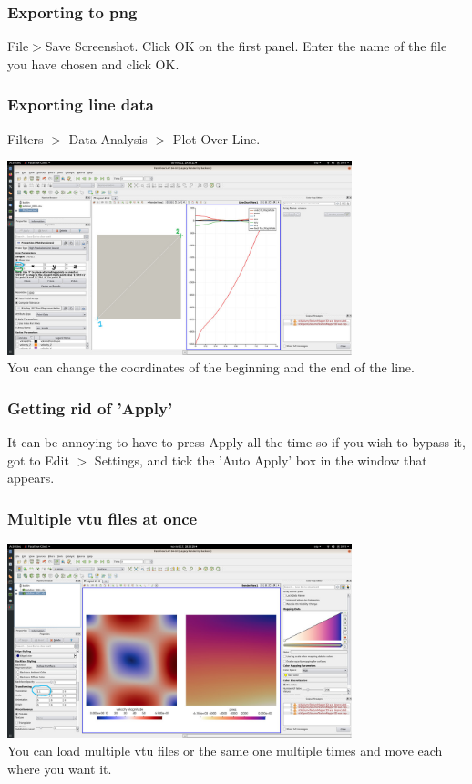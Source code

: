 \subsubsection*{Exporting to png}

File$>$Save Screenshot. Click OK on the first panel. Enter the name of the file you have chosen and click OK.   

\subsubsection*{Exporting line data}

Filters $>$ Data Analysis $>$ Plot Over Line.  

\begin{center}
\includegraphics[width=10cm]{images/paraview/p13}\\
{\captionfont You can change the coordinates of the beginning and the end of the line.} 
\end{center}

\subsubsection*{Getting rid of 'Apply'}

It can be annoying to have to press Apply all the time so if you wish to bypass it, got to Edit $>$ Settings, and 
tick the 'Auto Apply' box in the window that appears.

\subsubsection*{Multiple vtu files at once}

\begin{center}
\includegraphics[width=10cm]{images/paraview/p14}\\
{\captionfont You can load multiple vtu files or the same one multiple times and move each where you want it.} 
\end{center}

